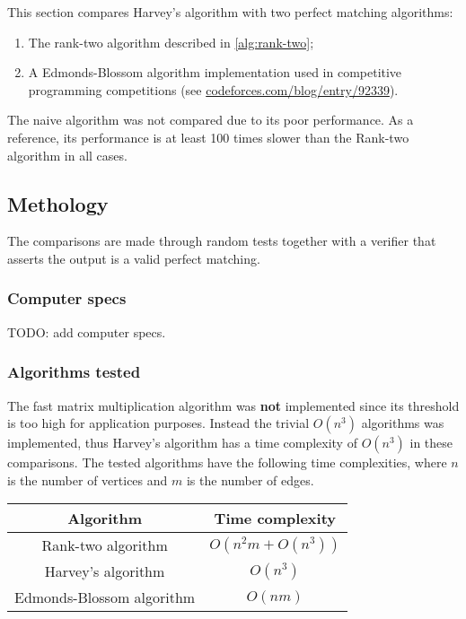 This section compares Harvey's algorithm with two perfect matching algorithms:
\begin{enumerate}
   \item The rank-two algorithm described in \cref{alg:rank-two};
 \item A Edmonds-Blossom algorithm implementation used in competitive programming competitions (see \href{https://codeforces.com/blog/entry/92339}{codeforces.com/blog/entry/92339}).
\end{enumerate}

The naive algorithm was not compared due to its poor performance.
As a reference, its performance is at least 100 times slower than the Rank-two algorithm in all cases.

\subsection{Methology}

The comparisons are made through random tests together with a verifier that asserts the output is a valid perfect matching.

\subsubsection{Computer specs}
TODO: add computer specs.

\subsubsection{Algorithms tested}
The fast matrix multiplication algorithm was \textbf{not} implemented since its threshold is too high for application purposes.
Instead the trivial $O(n^3)$ algorithms was implemented, thus Harvey's algorithm has a time complexity of \(O(n^3)\) in these comparisons.
The tested algorithms have the following time complexities, where \(n\) is the number of vertices and \(m\) is the number of edges.
\begin{center}
  \begin{tabular}{|c|c|}
    \hline
    Algorithm & Time complexity \\
    \hline
    Rank-two algorithm & \(O(n^2m + O(n^3))\) \\
    Harvey's algorithm & \(O(n^3)\) \\
    Edmonds-Blossom algorithm & \(O(nm)\) \\
    \hline
  \end{tabular}
\end{center}

